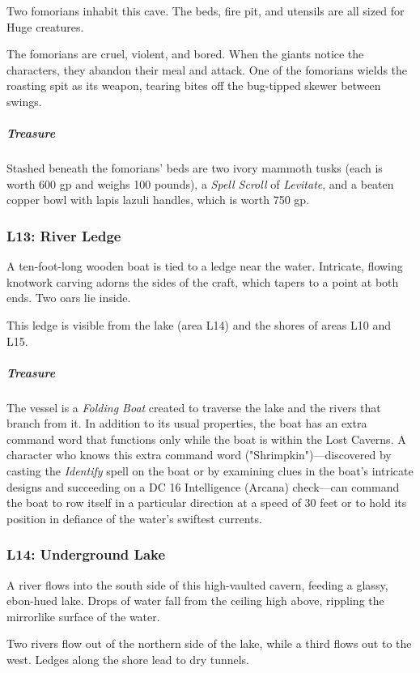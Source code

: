 \documentclass[10pt,a4paper,twoside,bg=print,twocolumn,openany,nodeprecatedcode]{dndbook}
\begin{document}
Two fomorians inhabit this cave. The beds, fire pit, and utensils are all sized for Huge creatures.

The fomorians are cruel, violent, and bored. When the giants notice the characters, they abandon their meal and attack. One of the fomorians wields the roasting spit as its weapon, tearing bites off the bug-tipped skewer between swings.

\subparagraph{Treasure}
Stashed beneath the fomorians' beds are two ivory mammoth tusks (each is worth 600 gp and weighs 100 pounds), a \textit{Spell Scroll} of \textit{Levitate}, and a beaten copper bowl with lapis lazuli handles, which is worth 750 gp.

\subsubsection{L13: River Ledge}
\begin{DndReadAloud}{}
A ten-foot-long wooden boat is tied to a ledge near the water. Intricate, flowing knotwork carving adorns the sides of the craft, which tapers to a point at both ends. Two oars lie inside.

\end{DndReadAloud}

This ledge is visible from the lake (area L14) and the shores of areas L10 and L15.

\subparagraph{Treasure}
The vessel is a \textit{Folding Boat} created to traverse the lake and the rivers that branch from it. In addition to its usual properties, the boat has an extra command word that functions only while the boat is within the Lost Caverns. A character who knows this extra command word ("Shrimpkin")—discovered by casting the \textit{Identify} spell on the boat or by examining clues in the boat's intricate designs and succeeding on a DC 16 Intelligence (Arcana) check—can command the boat to row itself in a particular direction at a speed of 30 feet or to hold its position in defiance of the water's swiftest currents.

\subsubsection{L14: Underground Lake}
\begin{DndReadAloud}{}
A river flows into the south side of this high-vaulted cavern, feeding a glassy, ebon-hued lake. Drops of water fall from the ceiling high above, rippling the mirrorlike surface of the water.

Two rivers flow out of the northern side of the lake, while a third flows out to the west. Ledges along the shore lead to dry tunnels.

\end{DndReadAloud}
\end{document}

